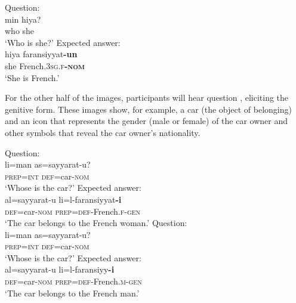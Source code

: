 \documentclass[output=paper,colorlinks,citecolor=brown,modfonts,nonflat]{../langscibook}
\begin{document}
            Question:\\
            \gll     min hiya?\\
                    who she\\
            \glt    ‘Who is she?’
        \ex%
        \label{ex:watorek:18d}
            Expected answer: \\
            \gll    hiya faransiyyat\textbf{{-un}}\\
                    she French\textsc{.3sg.f\textbf{-nom}}\\
            \glt    ‘She is French.’
        \z
    \z
\z

For the other half of the images, participants will hear question , eliciting the genitive form. These images show, for example, a car (the object of belonging) and an icon that represents the gender (male or female) of the car owner and other symbols that reveal the car owner’s nationality.

\ea%
    \label{ex:watorek:19}
    \ea%
    \label{ex:watorek:19a}
        \ea
            Question: \\
            \gll    li=man as=sayyarat-u?\\
                    \textsc{prep=int} \textsc{def=}car\textsc{-nom}\\
            \glt    ‘Whose is the car?’
        \ex%
        \label{ex:watorek:19b}
            Expected answer:\\
            \gll        al=sayyarat-u li=l-faransiyyat\textbf{{-i}}\\
                    \textsc{def=}car\textsc{-nom} \textsc{prep=def-}French\textsc{.f{-gen}}\\
            \glt    ‘The car belongs to the French woman.’
        \z
    \ex%
        \ea
        \label{ex:watorek:19c}
            Question:\\
            \gll    li=man as=sayyarat-u?\\
                    \textsc{prep=int} \textsc{def=}car\textsc{-nom}\\
            \glt    ‘Whose is the car?’
        \ex%
        \label{ex:watorek:19d}
            Expected answer:\\
            \gll    al=sayyarat-u li=l-faransiyy\textbf{{-i}}\\
                    \textsc{def=}car\textsc{-nom} \textsc{prep=def-}French\textsc{.m{-gen}}\\
            \glt    ‘The car belongs to the French man.’
        \z
    \z
\z
\end{document}
